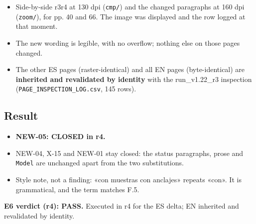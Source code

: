 \documentclass[
]{article}
\providecommand{\tightlist}{%
  \setlength{\itemsep}{0pt}\setlength{\parskip}{0pt}}
\begin{document}
\begin{itemize}
  \begin{itemize}
  \tightlist
  \item
    Side-by-side r3\textbar r4 at 130 dpi (\texttt{cmp/}) and the
    changed paragraphs at 160 dpi (\texttt{zoom/}), for pp. 40 and 66.
    The image was displayed and the row logged at that moment.
  \item
    The new wording is legible, with no overflow; nothing else on those
    pages changed.
  \item
    The other ES pages (raster-identical) and all EN pages
    (byte-identical) are \textbf{inherited and revalidated by identity}
    with the run\_v1.22\_r3 inspection
    (\texttt{PAGE\_INSPECTION\_LOG.csv}, 145 rows).
  \end{itemize}
\end{itemize}

\subsection{Result}\label{result}

\begin{itemize}
\tightlist
\item
  \textbf{NEW-05: CLOSED in r4.}
\item
  NEW-04, X-15 and NEW-01 stay closed: the status paragraphs, prose and
  \texttt{Model} are unchanged apart from the two substitutions.
\item
  Style note, not a finding: «con muestras con anclajes» repeats «con».
  It is grammatical, and the term matches F.5.
\end{itemize}

\textbf{E6 verdict (r4): PASS.} Executed in r4 for the ES delta; EN
inherited and revalidated by identity.
\end{document}
